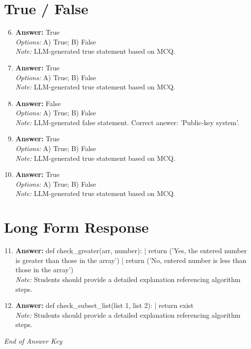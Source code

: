 \documentclass[12pt]{article}
\begin{document}
\section*{True / False}
\begin{enumerate}[label=\arabic*.]
\setcounter{enumi}{5}
\item \textbf{Answer:} True
\\ \textit{Options:} A) True; B) False
\\ \textit{Note:} LLM-generated true statement based on MCQ.
\item \textbf{Answer:} True
\\ \textit{Options:} A) True; B) False
\\ \textit{Note:} LLM-generated true statement based on MCQ.
\item \textbf{Answer:} False
\\ \textit{Options:} A) True; B) False
\\ \textit{Note:} LLM-generated false statement. Correct answer: 'Public-key system'.
\item \textbf{Answer:} True
\\ \textit{Options:} A) True; B) False
\\ \textit{Note:} LLM-generated true statement based on MCQ.
\item \textbf{Answer:} True
\\ \textit{Options:} A) True; B) False
\\ \textit{Note:} LLM-generated true statement based on MCQ.
\end{enumerate}

\section*{Long Form Response}
\begin{enumerate}[label=\arabic*.]
\setcounter{enumi}{10}
\item \textbf{Answer:} def check\_greater(arr, number): | return ('Yes, the entered number is greater than those in the array') | return ('No, entered number is less than those in the array')
\\ \textit{Note:} Students should provide a detailed explanation referencing algorithm steps.
\item \textbf{Answer:} def check\_subset\_list(list 1, list 2): | return exist
\\ \textit{Note:} Students should provide a detailed explanation referencing algorithm steps.
\end{enumerate}

\vfill
\noindent\textit{End of Answer Key}
\end{document}
